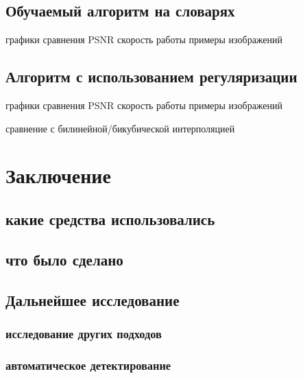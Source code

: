 \subsection{Обучаемый алгоритм на словарях}
графики сравнения PSNR скорость работы примеры изображений

\subsection{Алгоритм с использованием регуляризации }
графики сравнения PSNR скорость работы примеры изображений

сравнение с билинейной/бикубической интерполяцией

\section{Заключение}

\subsection{какие средства использовались}

\subsection{что было сделано}

\subsection{Дальнейшее исследование}

\subsubsection{исследование других подходов}

\subsubsection{автоматическое детектирование}

\newpage
\nocite{*}




